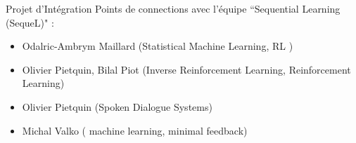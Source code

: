 \begin{frame}{Projet d'Intégration}
Points de connections avec l'équipe ``Sequential Learning (SequeL)" :

\begin{itemize}
	\item  Odalric-Ambrym Maillard (Statistical Machine Learning, RL )
	\item  Olivier Pietquin, Bilal Piot (Inverse Reinforcement Learning, Reinforcement Learning)
	\item Olivier Pietquin (Spoken Dialogue Systems)
	\item  Michal Valko ( machine learning, minimal feedback)
	
\end{itemize}
\end{frame}
